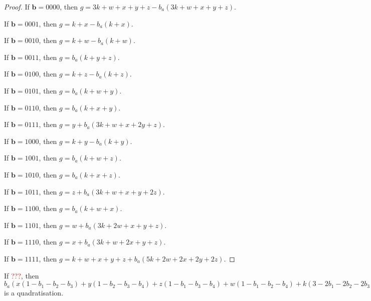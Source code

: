 \documentclass[11pt]{scrartcl}
\newcommand{\vc}[1]{\boldsymbol{#1}}
\begin{document}
\begin{proof}
If $\vc b = 0000$, then $g = 3k + w + x + y + z - b_a(3k + w + x + y + z)$.

If $\vc b = 0001$, then $g = k + x - b_a(k + x)$.

If $\vc b = 0010$, then $g = k + w - b_a(k + w)$.

If $\vc b = 0011$, then $g = b_a(k + y + z)$.

If $\vc b = 0100$, then $g = k + z - b_a(k + z)$.

If $\vc b = 0101$, then $g = b_a(k + w + y)$.

If $\vc b = 0110$, then $g = b_a(k + x + y)$.

If $\vc b = 0111$, then $g = y + b_a(3k + w + x + 2y + z)$.

If $\vc b = 1000$, then $g = k + y - b_a(k + y)$.

If $\vc b = 1001$, then $g = b_a(k + w + z)$.

If $\vc b = 1010$, then $g = b_a(k + x + z)$.

If $\vc b = 1011$, then $g = z + b_a(3k + w + x + y + 2z)$.

If $\vc b = 1100$, then $g = b_a(k + w + x)$.

If $\vc b = 1101$, then $g = w + b_a(3k + 2w + x + y + z)$.

If $\vc b = 1110$, then $g = x + b_a(3k + w + 2x + y + z)$.

If $\vc b = 1111$, then $g = k + w + x + y + z + b_a(5k + 2w + 2x + 2y + 2z)$.

\end{proof}

\begin{lemma}
 If \textcolor{red}{???}, then $b_a(x(1-b_1-b_2-b_3)+y(1-b_2-b_3-b_4)+z(1-b_1-b_3-b_4)+w(1-b_1-b_2-b_4)+k(3-2b_1-2b_2-2b_3-2b_4))+x(+b_1b_2+b_1b_3+b_2b_3)+y(+b_2b_3+b_2b_4+b_3b_4)+z(+b_1b_3+b_1b_4+b_3b_4)+w(+b_1b_2+b_1b_4+b_2b_4)+k(+b_1b_2+b_1b_3+b_1b_4+b_2b_3+b_2b_4+b_3b_4)$ is a quadratisation.\\
 \end{lemma}
\end{document}
